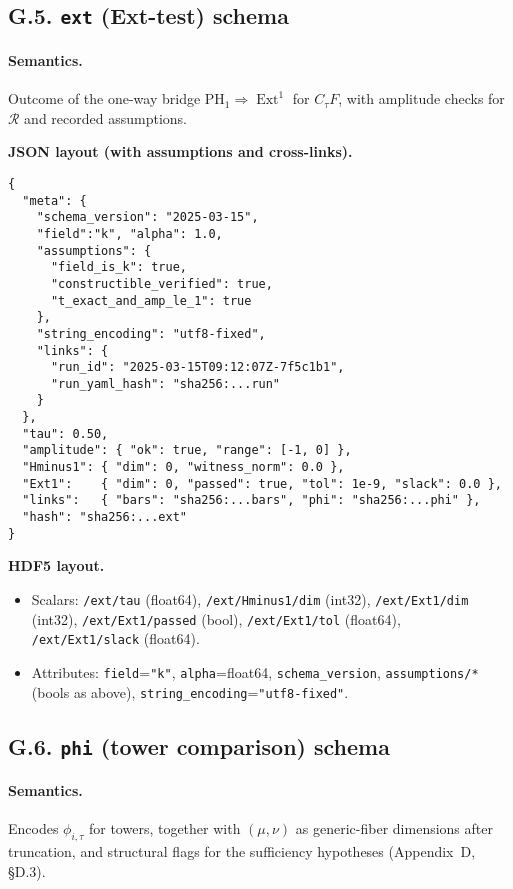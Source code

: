 \documentclass[11pt]{article}
\numberwithin{equation}{section}
\theoremstyle{plain}
\theoremstyle{definition}
\theoremstyle{remark}
\DeclareMathOperator{\Ext}{Ext}
\theoremstyle{plain}
\theoremstyle{definition}
\numberwithin{equation}{section}
\theoremstyle{definition}
\numberwithin{equation}{section}
\theoremstyle{plain}
\theoremstyle{definition}
\theoremstyle{remark}
\begin{document}
\subsection*{G.5. \texttt{ext} (Ext-test) schema}
\paragraph{Semantics.} Outcome of the one-way bridge \(\mathrm{PH}_1\Rightarrow \Ext^1\) for \(C_\tau F\), with
amplitude checks for \(\mathcal{R}\) and recorded assumptions.

\noindent\textbf{JSON layout (with assumptions and cross-links).}
\begin{verbatim}
{
  "meta": {
    "schema_version": "2025-03-15",
    "field":"k", "alpha": 1.0,
    "assumptions": {
      "field_is_k": true,
      "constructible_verified": true,
      "t_exact_and_amp_le_1": true
    },
    "string_encoding": "utf8-fixed",
    "links": {
      "run_id": "2025-03-15T09:12:07Z-7f5c1b1",
      "run_yaml_hash": "sha256:...run"
    }
  },
  "tau": 0.50,
  "amplitude": { "ok": true, "range": [-1, 0] },
  "Hminus1": { "dim": 0, "witness_norm": 0.0 },
  "Ext1":    { "dim": 0, "passed": true, "tol": 1e-9, "slack": 0.0 },
  "links":   { "bars": "sha256:...bars", "phi": "sha256:...phi" },
  "hash": "sha256:...ext"
}
\end{verbatim}

\noindent\textbf{HDF5 layout.}
\begin{itemize}[leftmargin=1.25em]
\item Scalars: \texttt{/ext/tau} (float64), \texttt{/ext/Hminus1/dim} (int32),
\texttt{/ext/Ext1/dim} (int32), \texttt{/ext/Ext1/passed} (bool), \texttt{/ext/Ext1/tol} (float64),
\texttt{/ext/Ext1/slack} (float64).
\item Attributes: \texttt{field}=\texttt{"k"}, \texttt{alpha}=float64, \texttt{schema\_version},
\texttt{assumptions/*} (bools as above), \texttt{string\_encoding}=\texttt{"utf8-fixed"}.
\end{itemize}

\subsection*{G.6. \texttt{phi} (tower comparison) schema}
\paragraph{Semantics.} Encodes \(\phi_{i,\tau}\) for towers, together with \((\mu,\nu)\) as generic-fiber
dimensions after truncation, and structural flags for the sufficiency hypotheses (Appendix~D, §D.3).
\end{document}
